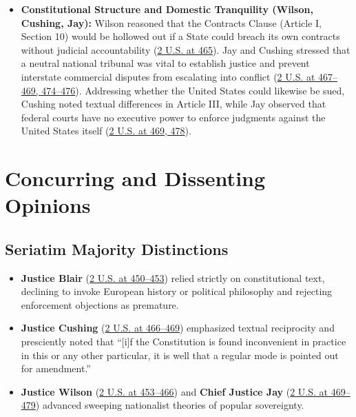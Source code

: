\documentclass[12pt]{article}
\begin{document}
\begin{itemize}
  \item \textbf{Constitutional Structure and Domestic Tranquility (Wilson, Cushing, Jay):} Wilson reasoned that the Contracts Clause (Article I, Section 10) would be hollowed out if a State could breach its own contracts without judicial accountability (\href{https://supreme.justia.com/cases/federal/us/2/419/}{2 U.S. at 465}). Jay and Cushing stressed that a neutral national tribunal was vital to establish justice and prevent interstate commercial disputes from escalating into conflict (\href{https://supreme.justia.com/cases/federal/us/2/419/}{2 U.S. at 467--469, 474--476}). Addressing whether the United States could likewise be sued, Cushing noted textual differences in Article III, while Jay observed that federal courts have no executive power to enforce judgments against the United States itself (\href{https://supreme.justia.com/cases/federal/us/2/419/}{2 U.S. at 469, 478}).
\end{itemize}

\section{Concurring and Dissenting Opinions}

\subsection{Seriatim Majority Distinctions}
\begin{itemize}
  \item \textbf{Justice Blair} (\href{https://supreme.justia.com/cases/federal/us/2/419/}{2 U.S. at 450--453}) relied strictly on constitutional text, declining to invoke European history or political philosophy and rejecting enforcement objections as premature.
  \item \textbf{Justice Cushing} (\href{https://supreme.justia.com/cases/federal/us/2/419/}{2 U.S. at 466--469}) emphasized textual reciprocity and presciently noted that ``[i]f the Constitution is found inconvenient in practice in this or any other particular, it is well that a regular mode is pointed out for amendment.''
  \item \textbf{Justice Wilson} (\href{https://supreme.justia.com/cases/federal/us/2/419/}{2 U.S. at 453--466}) and \textbf{Chief Justice Jay} (\href{https://supreme.justia.com/cases/federal/us/2/419/}{2 U.S. at 469--479}) advanced sweeping nationalist theories of popular sovereignty.
\end{itemize}
\end{document}

